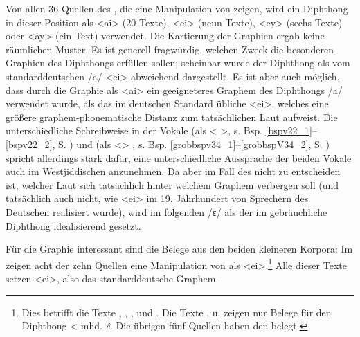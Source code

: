  
  Von allen 36 Quellen des , die eine Manipulation von  zeigen, wird ein  Diphthong in dieser Position als <ai> (20 Texte), <ei> (neun Texte), <ey> (sechs Texte) oder <ay> (ein Text) verwendet. Die Kartierung der Graphien ergab keine räumlichen Muster. Es ist generell fragwürdig, welchen Zweck die besonderen Graphien des Diphthongs erfüllen sollen; scheinbar wurde der Diphthong als vom standarddeutschen /a\textsubarch{\textsci}/ <ei> abweichend dargestellt. Es ist aber auch möglich, dass durch die Graphie als <ai> ein  geeigneteres Graphem des Diphthongs /a\textsubarch{\textsci}/ verwendet wurde, als das im deutschen Standard übliche <ei>, welches eine größere graphem-phonematische Distanz zum tatsächlichen Laut aufweist. Die unterschiedliche Schreibweise in  der Vokale  (als < >, s. Bsp.  \ref{bspv22_1}–\ref{bspv22_2}, S. \pageref{bspv22_1}) und   (als <> , s. Bsp. \ref{grobbspv34_1}–\ref{grobbspV34_2}, S. \pageref{grobbspV34_2}) spricht allerdings stark dafür, eine unterschiedliche Aussprache der beiden Vokale auch im Westjiddischen anzunehmen. Da aber im Fall des  nicht zu entscheiden ist, welcher Laut sich tatsächlich hinter welchem Graphem verbergen soll (und tatsächlich auch nicht, wie <ei> im 19. Jahrhundert von Sprechern des Deutschen realisiert wurde), wird im folgenden /ɛ\textsubarch{\textsci}/ als der im  gebräuchliche Diphthong idealisierend gesetzt. 
 
Für die Graphie interessant sind die Belege aus den beiden kleineren Korpora: Im  zeigen acht der zehn Quellen eine Manipulation von  als <ei>.\footnote{Dies betrifft die Texte , , ,  und . Die Texte ,  u.  zeigen nur Belege für den Diphthong < mhd.  \textit{ê}. Die  übrigen fünf Quellen haben den  belegt.} Alle dieser Texte setzen <ei>, also das standarddeutsche Graphem. 


